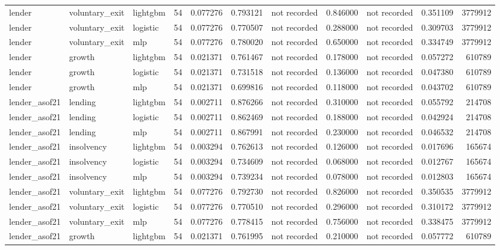 \begin{table}
{\begin{tabular}{lllrrrlrlrr}
lender & voluntary_exit & lightgbm & 54 & 0.077276 & 0.793121 & not recorded & 0.846000 & not recorded & 0.351109 & 3779912 \\
lender & voluntary_exit & logistic & 54 & 0.077276 & 0.770507 & not recorded & 0.288000 & not recorded & 0.309703 & 3779912 \\
lender & voluntary_exit & mlp & 54 & 0.077276 & 0.780020 & not recorded & 0.650000 & not recorded & 0.334749 & 3779912 \\
lender & growth & lightgbm & 54 & 0.021371 & 0.761467 & not recorded & 0.178000 & not recorded & 0.057272 & 610789 \\
lender & growth & logistic & 54 & 0.021371 & 0.731518 & not recorded & 0.136000 & not recorded & 0.047380 & 610789 \\
lender & growth & mlp & 54 & 0.021371 & 0.699816 & not recorded & 0.118000 & not recorded & 0.043702 & 610789 \\
lender_asof21 & lending & lightgbm & 54 & 0.002711 & 0.876266 & not recorded & 0.310000 & not recorded & 0.055792 & 214708 \\
lender_asof21 & lending & logistic & 54 & 0.002711 & 0.862469 & not recorded & 0.188000 & not recorded & 0.042924 & 214708 \\
lender_asof21 & lending & mlp & 54 & 0.002711 & 0.867991 & not recorded & 0.230000 & not recorded & 0.046532 & 214708 \\
lender_asof21 & insolvency & lightgbm & 54 & 0.003294 & 0.762613 & not recorded & 0.126000 & not recorded & 0.017696 & 165674 \\
lender_asof21 & insolvency & logistic & 54 & 0.003294 & 0.734609 & not recorded & 0.068000 & not recorded & 0.012767 & 165674 \\
lender_asof21 & insolvency & mlp & 54 & 0.003294 & 0.739234 & not recorded & 0.078000 & not recorded & 0.012803 & 165674 \\
lender_asof21 & voluntary_exit & lightgbm & 54 & 0.077276 & 0.792730 & not recorded & 0.826000 & not recorded & 0.350535 & 3779912 \\
lender_asof21 & voluntary_exit & logistic & 54 & 0.077276 & 0.770510 & not recorded & 0.296000 & not recorded & 0.310172 & 3779912 \\
lender_asof21 & voluntary_exit & mlp & 54 & 0.077276 & 0.778415 & not recorded & 0.756000 & not recorded & 0.338475 & 3779912 \\
lender_asof21 & growth & lightgbm & 54 & 0.021371 & 0.761995 & not recorded & 0.210000 & not recorded & 0.057772 & 610789 \\

\end{tabular}}
\end{table}
